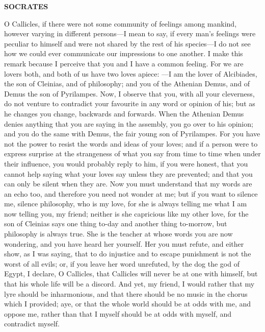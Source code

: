\documentclass[11pt,letter]{article}
\begin{document}
\par \textbf{SOCRATES}
\par   O Callicles, if there were not some community of feelings among mankind, however varying in different persons—I mean to say, if every man’s feelings were peculiar to himself and were not shared by the rest of his species—I do not see how we could ever communicate our impressions to one another. I make this remark because I perceive that you and I have a common feeling. For we are lovers both, and both of us have two loves apiece: —I am the lover of Alcibiades, the son of Cleinias, and of philosophy; and you of the Athenian Demus, and of Demus the son of Pyrilampes. Now, I observe that you, with all your cleverness, do not venture to contradict your favourite in any word or opinion of his; but as he changes you change, backwards and forwards. When the Athenian Demus denies anything that you are saying in the assembly, you go over to his opinion; and you do the same with Demus, the fair young son of Pyrilampes. For you have not the power to resist the words and ideas of your loves; and if a person were to express surprise at the strangeness of what you say from time to time when under their influence, you would probably reply to him, if you were honest, that you cannot help saying what your loves say unless they are prevented; and that you can only be silent when they are. Now you must understand that my words are an echo too, and therefore you need not wonder at me; but if you want to silence me, silence philosophy, who is my love, for she is always telling me what I am now telling you, my friend; neither is she capricious like my other love, for the son of Cleinias says one thing to-day and another thing to-morrow, but philosophy is always true. She is the teacher at whose words you are now wondering, and you have heard her yourself. Her you must refute, and either show, as I was saying, that to do injustice and to escape punishment is not the worst of all evils; or, if you leave her word unrefuted, by the dog the god of Egypt, I declare, O Callicles, that Callicles will never be at one with himself, but that his whole life will be a discord. And yet, my friend, I would rather that my lyre should be inharmonious, and that there should be no music in the chorus which I provided; aye, or that the whole world should be at odds with me, and oppose me, rather than that I myself should be at odds with myself, and contradict myself.
\end{document}
